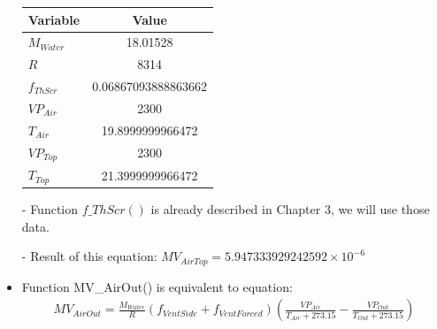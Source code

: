 \documentclass[a4paper]{article}
\numberwithin{equation}{section}
\begin{document}
\begin{itemize}
        \begin{table}[H]
          \centering
          \begin{tabular}{@{}lS[table-format=4.17]@{}}
            \toprule
            \textbf{Variable} & \textbf{Value}      \\
            \midrule
            \(M_{Water}\)     & 18.01528            \\
            \(R\)             & 8314                \\
            \(f_{ThScr}\)     & 0.06867093888863662 \\
            \(VP_{Air}\)      & 2300                \\
            \(T_{Air}\)       & 19.8999999966472    \\
            \(VP_{Top}\)      & 2300                \\
            \(T_{Top}\)       & 21.3999999966472    \\
            \bottomrule
          \end{tabular}
        \end{table}

  \item [-] Function \hyperref[fThScr]{\underline{\(f\_ThScr()\)}} is already described in Chapter 3, we will use those data.
  \item[-] Result of this equation: \(MV_{AirTop} = 5.947333929242592 \times 10^{-6} \)

  \item Function MV\_AirOut() is equivalent to equation:
        \begin{align*}
          MV_{AirOut}  = \frac{M_{Water}}{R} (f_{VentSide} + f_{VentForced}) (\frac{VP_{Air}}{T_{Air} + 273.15} - \frac{VP_{Out}}{T_{Out} + 273.15})
        \end{align*}


\end{itemize}
\end{document}
